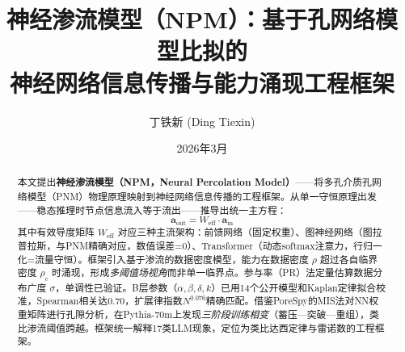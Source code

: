 \documentclass[11pt,a4paper]{article}
\newcommand{\Weff}{W_{\text{eff}}}
\begin{document}
\title{\textbf{神经渗流模型（NPM）：基于孔网络模型比拟的\\神经网络信息传播与能力涌现工程框架}}

\author[1]{丁铁新 (Ding Tiexin)}
\date{2026年3月}
\maketitle

\renewcommand{\abstractname}{摘要}
\begin{abstract}
本文提出\textbf{神经渗流模型（NPM，Neural Percolation Model）}——将多孔介质孔网络模型（PNM）物理原理映射到神经网络信息传播的工程框架。从单一守恒原理出发——稳态推理时节点信息流入等于流出——推导出统一主方程：
\[
  \mathbf{a}_{\text{out}} = \Weff \cdot \mathbf{a}_{\text{in}}
\]
其中有效导度矩阵 $\Weff$ 对应三种主流架构：前馈网络（固定权重）、图神经网络（图拉普拉斯，与PNM精确对应，数值误差=0）、Transformer（动态softmax注意力，行归一化=流量守恒）。框架引入基于渗流的数据密度模型，能力在数据密度 $\rho$ 超过各自临界密度 $\rho_c$ 时涌现，形成\emph{多阈值场视角}而非单一临界点。参与率（PR）法定量估算数据分布广度 $\sigma$，单调性已验证。B层参数（$\alpha,\beta,\delta,k$）已用14个公开模型和Kaplan定律拟合校准，Spearman相关达0.70，扩展律指数$N^{0.076}$精确匹配。借鉴PoreSpy的MIS法对NN权重矩阵进行孔隙分析，在Pythia-70m上发现\emph{三阶段训练相变}（蓄压—突破—重组），类比渗流阈值跨越。框架统一解释17类LLM现象，定位为类比达西定律与雷诺数的工程框架。
\end{abstract}
\end{document}
